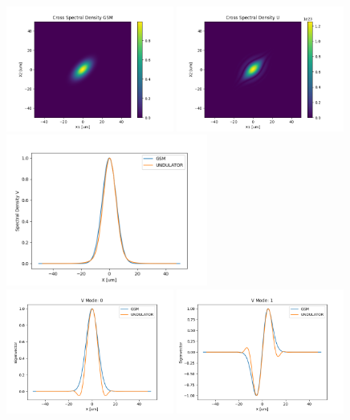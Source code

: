 \documentclass{iucr}              %
\begin{document}
\begin{figure}
    \centering
    \includegraphics[width=0.49\textwidth]{figures/comparison_V_CSD_GSM.png}
    \includegraphics[width=0.49\textwidth]{figures/comparison_V_CSD_U.png}
    \includegraphics[width=0.59\textwidth]{figures/comparison_V_SD.png}
    \includegraphics[width=0.49\textwidth]{figures/comparison_V_eigenvector0.png}
    \includegraphics[width=0.49\textwidth]{figures/comparison_V_eigenvector1.png}

\end{figure}
\end{document}
